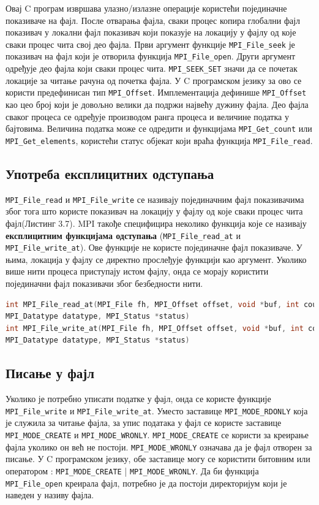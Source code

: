 Овај C програм извршава улазно/излазне операције користећи појединачне показиваче на фајл. После отварања фајла, сваки процес копира глобални фајл показивач у локални фајл показивач који показује на локацију у фајлу од које сваки процес чита свој део фајла. Први аргумент функције \texttt{MPI\_File\_seek} је показивач на фајл који је отворила функција 
\texttt{MPI\_File\_open}. Други аргумент одређује део фајла који сваки процес чита. \texttt{MPI\_SEEK\_SET} значи да се почетак локације за читање рачуна од почетка фајла. У C програмском језику 
за ово се користи предефинисан тип \texttt{MPI\_Offset}. Имплементација дефинише \texttt{MPI\_Offset} као цео број који је довољно велики да подржи највећу дужину фајла. Део фајла сваког процеса се одређује производом ранга процеса и величине податка у бајтовима. Величина податка може се одредити и функцијама \texttt{MPI\_Get\_count} или \texttt{MPI\_Get\_elements}, користећи статус објекат који враћа функција \texttt{MPI\_File\_read}.


\subsection{Употреба експлицитних одступања}

\texttt{MPI\_File\_read} и \texttt{MPI\_File\_write} се називају појединачним фајл показивачима због тога што користе показивач на локацију у фајлу од које сваки процес чита фајл(Листинг 3.7). MPI такође специфицира  неколико функција које се називају \textbf{експлицитним функцијама одступања} (\texttt{MPI\_File\_read\_at} и \texttt{MPI\_File\_write\_at}). Ове функције не користе појединачне фајл показиваче. У њима, локација у фајлу се директно прослеђује функцији као аргумент. Уколико више нити процеса приступају истом фајлу, онда се морају користити појединачни фајл показивачи због безбедности нити.

\begin{lstlisting}[style=nonumbers,frame=single,language=C, caption= MPI функције]
int MPI_File_read_at(MPI_File fh, MPI_Offset offset, void *buf, int count,
MPI_Datatype datatype, MPI_Status *status)
int MPI_File_write_at(MPI_File fh, MPI_Offset offset, void *buf, int count,
MPI_Datatype datatype, MPI_Status *status)
\end{lstlisting}

\subsection{Писање у фајл}
Уколико је потребно уписати податке у фајл, онда се користе функције \texttt{MPI\_File\_write} и \texttt{MPI\_File\_write\_at}. Уместо заставице \texttt{MPI\_MODE\_RDONLY} која је служила за читање фајла, за упис података у фајл се користе заставице \texttt{MPI\_MODE\_CREATE} и \texttt{MPI\_MODE\_WRONLY}. \texttt{MPI\_MODE\_CREATE} се користи за креирање фајла уколико он већ не постоји. \texttt{MPI\_MODE\_WRONLY} означава да је фајл отворен за писање. У C програмском језику, обе заставице могу се користити битовним или оператором :  \texttt{MPI\_MODE\_CREATE} | \texttt{MPI\_MODE\_WRONLY}. Да би функција \texttt{MPI\_File\_open} креирала фајл, потребно је да постоји директоријум који је наведен у називу фајла.

